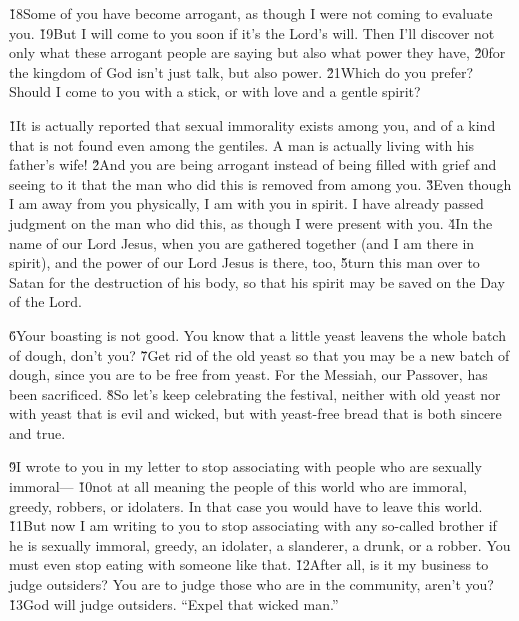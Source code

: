 \v{18}Some of you have become arrogant, as though I were not coming to evaluate you. \v{19}But I will come to you soon if it's the Lord's will. Then I'll discover not only what these arrogant people are saying but also what power they have, \v{20}for the kingdom of God isn't just talk, but also power. \v{21}Which do you prefer? Should I come to you with a stick, or with love and a gentle spirit?

\v{1}It is actually reported that sexual immorality exists among you, and of a kind that is not found even among the gentiles. A man is actually living with his father's wife! \v{2}And you are being arrogant instead of being filled with grief and seeing to it that the man who did this is removed from among you. \v{3}Even though I am away from you physically, I am with you in spirit. I have already passed judgment on the man who did this, as though I were present with you. \v{4}In the name of our Lord Jesus, when you are gathered together (and I am there in spirit), and the power of our Lord Jesus is there, too, \v{5}turn this man over to Satan for the destruction of his body, so that his spirit may be saved on the Day of the Lord.

\v{6}Your boasting is not good. You know that a little yeast leavens the whole batch of dough, don't you? \v{7}Get rid of the old yeast so that you may be a new batch of dough, since you are to be free from yeast. For the Messiah, our Passover, has been sacrificed. \v{8}So let's keep celebrating the festival, neither with old yeast nor with yeast that is evil and wicked, but with yeast-free bread that is both sincere and true.

\v{9}I wrote to you in my letter to stop associating with people who are sexually immoral--- \v{10}not at all meaning the people of this world who are immoral, greedy, robbers, or idolaters. In that case you would have to leave this world. \v{11}But now I am writing to you to stop associating with any so-called brother if he is sexually immoral, greedy, an idolater, a slanderer, a drunk, or a robber. You must even stop eating with someone like that. \v{12}After all, is it my business to judge outsiders? You are to judge those who are in the community, aren't you? \v{13}God will judge outsiders. ``Expel that wicked man.''

